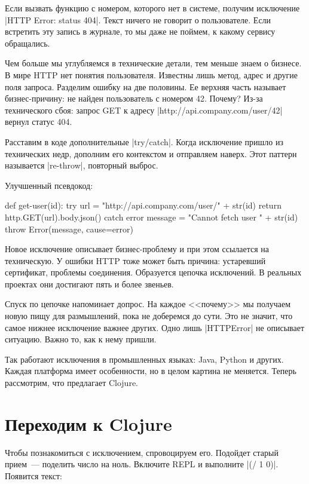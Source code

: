 Если вызвать функцию с номером, которого нет в системе, получим исключение
\spverb|HTTP Error: status 404|. Текст ничего не говорит о пользователе. Если
встретить эту запись в журнале, то мы даже не поймем, к какому сервису
обращались.

Чем больше мы углубляемся в технические детали, тем меньше знаем о бизнесе. В
мире HTTP нет понятия пользователя. Известны лишь метод, адрес и другие поля
запроса. Разделим ошибку на две половины. Ее верхняя часть называет
бизнес-причину: не найден пользователь с номером 42. Почему? Из-за технического
сбоя: запрос GET к адресу \spverb|http://api.company.com/user/42| вернул статус
404.

Расставим в коде дополнительные \spverb|try/catch|. Когда исключение пришло из
технических недр, дополним его контекстом и отправляем наверх. Этот паттерн
называется \spverb|re-throw|, повторный выброс.

Улучшенный псевдокод:

\begin{english}
  \begin{js}
def get-user(id):
  try {
    url = "http://api.company.com/user/" + str(id)
    return http.GET(url).body.json()
  } catch error {
    message = "Cannot fetch user " + str(id)
    throw Error(message, cause=error)
  }
  \end{js}
\end{english}

Новое исключение описывает бизнес-проблему и при этом ссылается на
техническую. У ошибки HTTP тоже может быть причина: устаревший сертификат,
проблемы соединения. Образуется цепочка исключений. В реальных проектах они
достигают пять и более звеньев.

Спуск по цепочке напоминает допрос. На каждое <<почему>> мы получаем новую пищу
для размышлений, пока не доберемся до сути. Это не значит, что самое нижнее
исключение важнее других. Одно лишь \spverb|HTTPError| не описывает
ситуацию. Важно то, как к нему пришли.

Так работают исключения в промышленных языках: Java, Python и других. Каждая
платформа имеет особенности, но в целом картина не меняется. Теперь рассмотрим,
что предлагает Clojure.

\section{Переходим к Clojure}

Чтобы познакомиться с исключением, спровоцируем его. Подойдет старый прием~---
поделить число на ноль. Включите REPL и выполните \spverb|(/ 1 0)|. Появится
текст:

